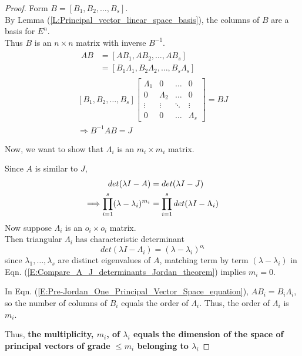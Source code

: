 \documentclass[twoside]{amsart}
\theoremstyle{plain}
\theoremstyle{definition}
\begin{document}
\begin{proof}
  Form $B = [B_1,B_2, \dots , B_s ]$.  \\
  By Lemma (\ref{L:Principal_vector_linear_space_basis}), the columns of $B$ are a basis for $E^n$.  \\
  \phantom{By} Thus $B$ is an $n \times n$ matrix with inverse $B^{-1}$.  
  \begin{gather*}
    \begin{aligned}
      AB & = [AB_1, AB_2, \dots , AB_s]\\
      & = [B_1 \Lambda_1, B_2 \Lambda_2, \dots , B_s \Lambda_s ] 
    \end{aligned} \\
    [B_1, B_2, \dots , B_s] \left[ \begin{matrix} \Lambda_1 & 0 & \dots & 0 \\
	0 & \Lambda_2 & \dots & 0 \\
	\vdots & \vdots & \ddots & \vdots \\
	0 & 0 & \dots & \Lambda_s 
	\end{matrix}
      \right]
    = BJ \\
    \Longrightarrow B^{-1}AB = J 
  \end{gather*}
  
Now, we want to show that $\Lambda_i$ is an $m_i \times m_i $ matrix.  

Since $A$ is similar to $J$, 
\begin{align}
  det(\lambda I - A) & = det(\lambda I - J) \notag \\
  \Longrightarrow \prod_{i=1}^s (\lambda - \lambda_i)^{m_i} & = \prod_{i=1}^s det(\lambda I- \Lambda_i) \label{E:Compare_A_J_determinants_Jordan_theorem}
\end{align}
Now suppose $\Lambda_i$ is an $o_i \times o_i$ matrix.  \\
\phantom{Now} Then triangular $\Lambda_i$ has characteristic determinant
\[
det(\lambda I - \Lambda_i) = (\lambda-\lambda_i)^{o_i}
\]
since $\lambda_1, \dots , \lambda_s$ are distinct eigenvalues of $A$, matching term by term $(\lambda - \lambda_i)$ in Eqn. (\ref{E:Compare_A_J_determinants_Jordan_theorem}) implies $m_i =0 $.  

In Eqn. (\ref{E:Pre-Jordan_One_Principal_Vector_Space_equation}), $AB_i = B_i \Lambda_i$, so the number of columns of $B_i$ equals the order of $\Lambda_i$.  Thus, the order of $\Lambda_i$ is $m_i$.  

Thus, \textbf{ the multiplicity, $m_i$, of $\lambda_i$ equals the dimension of the space of principal vectors of grade $\leq m_i$ belonging to $\lambda_i$ }
\end{proof}
\end{document}
